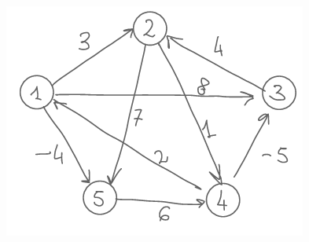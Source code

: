 \begin{figure}[h!]
    \centering
    \includegraphics[width=0.75\linewidth]{immagini//capitolo 14 esercizio/14_grafo.png}
\end{figure}


